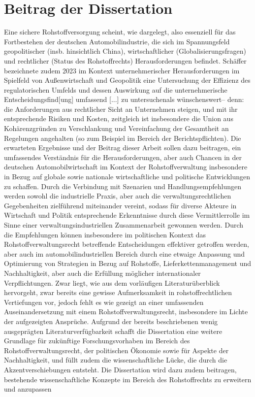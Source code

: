 \documentclass[12pt,a4paper,oneside]{book} %
\begin{document}
\section{Beitrag der Dissertation}
Eine sichere Rohstoffversorgung scheint, wie dargelegt, also essenziell für das Fortbestehen der deutschen Automobilindustrie, die sich im Spannungsfeld geopolitischer (insb. hinsichtlich China), wirtschaftlicher (Globalisierungsfragen) und rechtlicher (Status des Rohstoffrechts) Herausforderungen befindet. Schäffer bezeichnete zudem 2023\autocite{Schäffer, EuZW 2023, 695} im Kontext unternehmerischer Herausforderungen im Spielfeld von Außenwirtschaft und Geopolitik eine Untersuchung der \glqq Effizienz des regulatorischen Umfelds und dessen Auswirkung auf die unternehmerische Entscheidungsfind[ung] umfassend [...] zu untersuchen\grqq als \glqq wünschenswert\grqq -- denn: die Anforderungen aus rechtlicher Sicht an Unternehmen steigen, und mit ihr entsprechende Risiken und Kosten, zeitgleich ist insbesondere die Union aus Kohärenzgründen zu Verschlankung und Vereinfachung der Gesamtheit an Regelungen angehalten (so zum Beispiel im Bereich der Berichtspflichten).\autocite{Schäffer, EuZW 2023, 695}
Die erwarteten Ergebnisse und der Beitrag dieser Arbeit sollen dazu beitragen, ein umfassendes Verständnis für die Herausforderungen, aber auch Chancen in der deutschen Automobilwirtschaft im Kontext der Rohstoffverwaltung insbesondere in Bezug auf globale sowie nationale wirtschaftliche und politische Entwicklungen zu schaffen. Durch die Verbindung mit Szenarien und Handlungsempfehlungen werden sowohl die industrielle Praxis, aber auch die verwaltungsrechtlichen Gegebenheiten zielführend miteinander vereint, sodass für diverse Akteure in Wirtschaft und Politik entsprechende Erkenntnisse durch diese Vermittlerrolle im Sinne einer verwaltungsindustriellen Zusammenarbeit gewonnen werden. Durch die Empfehlungen können insbesondere im politischen Kontext das Rohstoffverwaltungsrecht betreffende Entscheidungen effektiver getroffen werden, aber auch im automobilindustriellen Bereich durch eine etwaige Anpassung und Optimierung von Strategien in Bezug auf Rohstoffe, Lieferkettenmanagement und Nachhaltigkeit, aber auch die Erfüllung möglicher internationaler Verpflichtungen. Zwar liegt, wie aus dem vorläufigen Literaturüberblick hervorgeht, zwar bereits eine gewisse Aufmerksamkeit in rohstoffrechtlichen Vertiefungen vor, jedoch fehlt es wie gezeigt an einer umfassenden Auseinandersetzung mit einem Rohstoffverwaltungsrecht, insbesondere im Lichte der aufgezeigten Ansprüche.
Aufgrund der bereits beschriebenen wenig ausgeprägten Literaturverfügbarkeit schafft die Dissertation eine weitere Grundlage für zukünftige Forschungsvorhaben im Bereich des Rohstoffverwaltungsrecht, der politischen Ökonomie sowie für Aspekte der Nachhaltigkeit, und füllt zudem die wissenschaftliche Lücke, die durch die Akzentverschiebungen entsteht. Die Dissertation wird dazu zudem beitragen, bestehende wissenschaftliche Konzepte im Bereich des Rohstoffrechts zu erweitern und anzupassen
\end{document}
